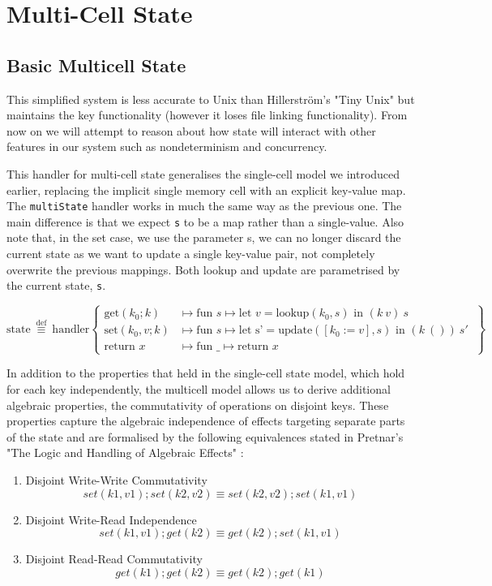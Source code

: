 \documentclass[logo,bsc,singlespacing,parskip]{infthesis}
\begin{document}
\section{Multi-Cell State}


\subsection{Basic Multicell State}

This simplified system is less accurate to Unix than Hillerström's "Tiny Unix" but maintains the key functionality (however it loses file linking functionality). From now on we will attempt to reason about how state will interact with other features in our system such as nondeterminism and concurrency. 

This handler for multi-cell state generalises the single-cell model we introduced earlier, replacing the implicit single memory cell with an explicit key-value map. The \lstinline{multiState} handler works in much the same way as the previous one. The main difference is that we expect \lstinline{s} to be a map rather than a single-value. Also note that, in the set case, we use the parameter s, we can no longer discard the current state as we want to update a single key-value pair, not completely overwrite the previous mappings. Both lookup and update are parametrised by the current state, \lstinline{s}.

\[
\text{state} \ \overset{\text{def}}{\equiv} \ \text{handler} \left\{
\begin{array}{ll}
\text{get}(k_0; k) &\mapsto \text{fun } s \mapsto \text{let } v = \text{lookup}(k_0, s) \text{ in } (k\ v)\ s \\
\text{set}(k_0, v; k) &\mapsto \text{fun } s \mapsto \text{let s'} = \text{update}([k_0:=v],s) \text{ in } (k\ ())\ s'\ \\
\text{return } x &\mapsto \text{fun } \_ \mapsto \text{return } x
\end{array}
\right\}
\]


In addition to the properties that held in the single-cell state model, which hold for each key independently, the multicell model allows us to derive additional algebraic properties, the commutativity of operations on disjoint keys. These properties capture the algebraic independence of effects targeting separate parts of the state and are formalised by the following equivalences stated in Pretnar's "The Logic and Handling of
Algebraic Effects" \cite{Pretnar:2010}:
\begin{enumerate}
    \item Disjoint Write-Write Commutativity
    \[set(k1,v1);set(k2,v2) \equiv set(k2,v2);set(k1,v1)\] 
    \item Disjoint Write-Read Independence
        \[set(k1,v1);get(k2) \equiv get(k2);set(k1,v1)\] 
    \item Disjoint Read-Read Commutativity
        \[get(k1);get(k2) \equiv get(k2);get(k1)\] 
\end{enumerate}
\end{document}
